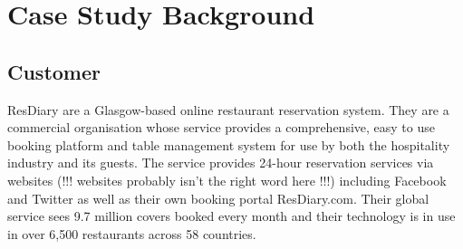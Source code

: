 \documentclass{l3proj}
\begin{document}
\newpage


\section{Case Study Background}
\label{sec:background}


\subsection{Customer}
\label{customer}


ResDiary are a Glasgow-based online restaurant reservation system. They are a commercial organisation whose service provides a comprehensive, easy to use booking platform and table management system for use by both the hospitality industry and its guests. The service provides 24-hour reservation services via websites (!!! websites probably isn’t the right word here !!!) including Facebook and Twitter as well as their own booking portal ResDiary.com. Their global service sees 9.7 million covers booked every month and their technology is in use in over 6,500 restaurants across 58 countries.
\end{document}
